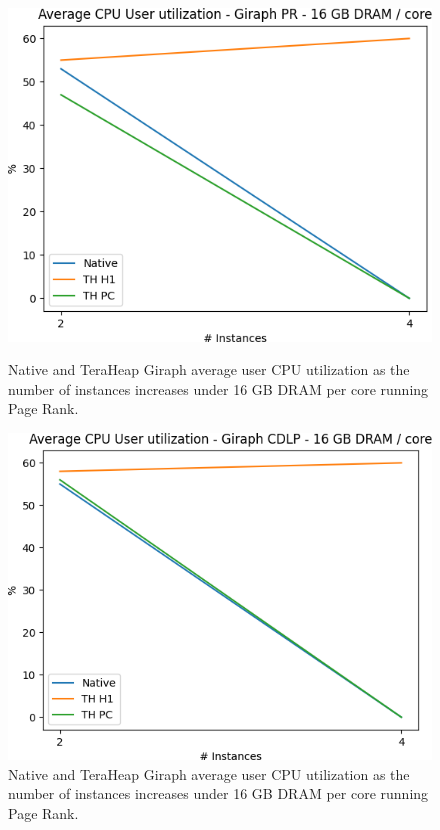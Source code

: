 \begin{figure}[thbp]
	\centering
        \includegraphics[width=\linewidth]{./fig/G_PR_128_USR.png}
    \caption{Native and TeraHeap Giraph average user CPU utilization
        as the number of instances increases under 16 GB DRAM per core running Page Rank.}
        \label{fig:g_pr128_usr}
        \includegraphics[width=\linewidth]{./fig/G_CDLP_128_USR.png}
    \caption{Native and TeraHeap Giraph average user CPU utilization
        as the number of instances increases under 16 GB DRAM per core running Page Rank.}
        \label{fig:g_cdlp128_usr}
\end{figure}

